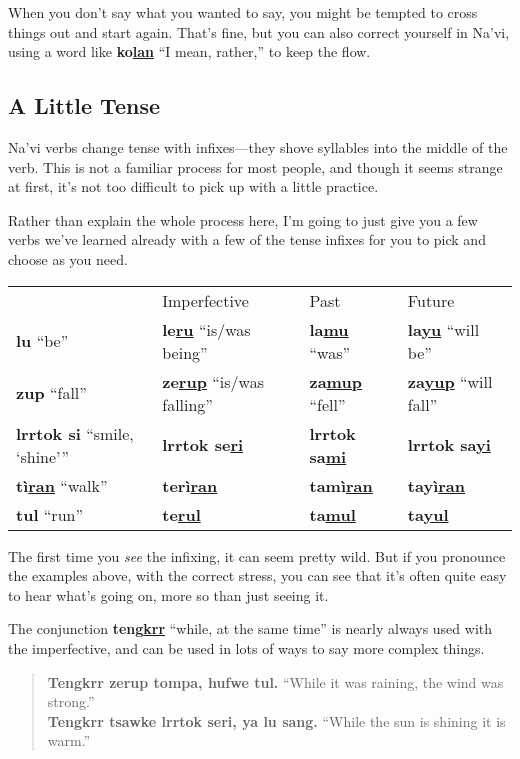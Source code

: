 \documentclass[nofonts]{tufte-handout}
\newcommand{\N}[1]{\textbf{\textcolor{navi}{#1}}}
\begin{document}
When you don't say what you wanted to say, you might be tempted to
cross things out and start again.  That's fine, but you can also
correct yourself in Na'vi, using a word like \N{ko\uline{lan}} ``I
mean, rather,'' to keep the flow.

\subsection*{A Little Tense}
Na'vi verbs change tense with infixes—they shove syllables into the
middle of the verb.  This is not a familiar process for most people,
and though it seems strange at first, it's not too difficult to pick up
with a little practice.

Rather than explain the whole process here, I'm going to just give you
a few verbs we've learned already with a few of the tense infixes for
you to pick and choose as you need. 

\medskip
\begin{tabular}{llll}
  & Imperfective & Past & Future \\
\N{lu} ``be'' & \N{le\uline{ru}} ``is/was being'' & \N{la\uline{mu}}
    ``was'' & \N{la\uline{yu}} ``will be'' \\
\N{zup} ``fall'' & \N{ze\uline{rup}} ``is/was falling'' & \N{za\uline{mup}}
    ``fell'' & \N{za\uline{yup}} ``will fall''\\
\N{lrrtok si} ``smile, `shine''' & \N{lrrtok se\uline{ri}} &
    \N{lrrtok sa\uline{mi}} & \N{lrrtok sa\uline{yi}} \\
\N{tì\uline{ran}} ``walk'' & \N{terì\uline{ran}} & \N{tamì\uline{ran}} &
    \N{tayì\uline{ran}} \\
\N{tul} ``run'' & \N{te\uline{rul}} & \N{ta\uline{mul}}
     & \N{ta\uline{yul}} 
\end{tabular}
\medskip

\noindent The first time you \textit{see} the infixing,
it can seem pretty wild.  But if you pronounce the examples above,
with the correct stress, you can see that it's often quite easy to
hear what's going on, more so than just seeing it.

The conjunction \N{teng\uline{krr}} ``while, at the same time'' is
nearly always used with the imperfective, and can be used in lots of
ways to say more complex things.

\begin{quotation}
\noindent\N{Tengkrr zerup tompa, hufwe tul.} ``While it was raining,
the wind was strong.''\\

\noindent\N{Tengkrr tsawke lrrtok seri, ya lu sang.} ``While the sun is
shining it is warm.''
\end{quotation}
\end{document}
